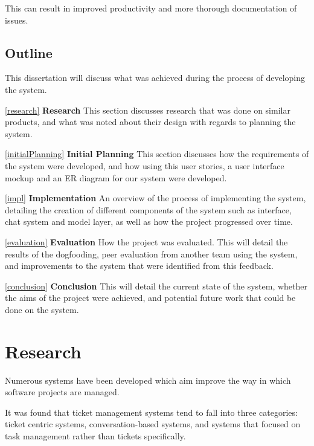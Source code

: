 \documentclass[a4paper]{l3proj}
\begin{document}
This can result in improved productivity and more thorough documentation of issues.

\section{Outline}
\label{outline}

This dissertation will discuss what was achieved during the process of developing the system.

\autoref{research} \textbf{Research} 
This section discusses research that was done on similar products, and what was noted about their design with regards to planning the system.

\autoref{initialPlanning} \textbf{Initial Planning} 
This section discusses how the requirements of the system were developed, and how using this user stories, a user interface mockup and an ER diagram for our system were developed.

\autoref{impl} \textbf{Implementation} 
An overview of the process of implementing the system, detailing the creation of different components of the system such as interface, chat system and model layer, as well as how the project progressed over time.

\autoref{evaluation} \textbf{Evaluation} 
How the project was evaluated.  This will detail the results of the dogfooding, peer evaluation from another team using the system, and improvements to the system that were identified from this feedback.

\autoref{conclusion} \textbf{Conclusion} 
This will detail the current state of the system, whether the aims of the project were achieved, and potential future work that could be done on the system.


\chapter{Research}
\label{research}

Numerous systems have been developed which aim improve the way in which software projects are managed.

It was found that ticket management systems tend to fall into three categories: ticket centric systems, conversation-based systems, and systems that focused on task management rather than tickets specifically. 
\end{document}
